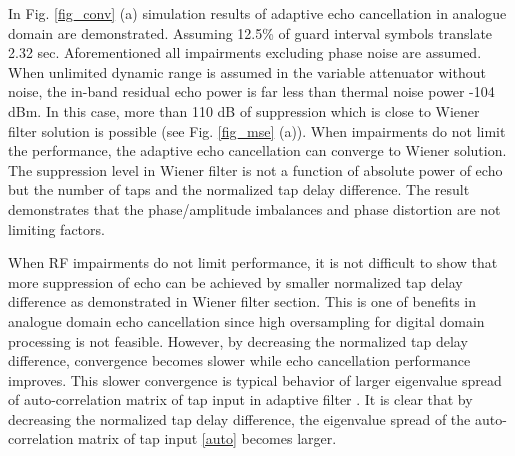 \documentclass[twocolumn]{IEEEtran}
\begin{document}
\begin{figure*}[!ht]

\centerline{ 
    \hfil
{}}


\caption{Adaptive analogue echo canceller with 3 taps,
 and two echoes (-4.2 and -44 dBm): (a)
Convergence (b) Spectrum.} \label{fig_conv}

\end{figure*}

In Fig. \ref{fig_conv} (a) simulation results of adaptive echo
cancellation in analogue domain are demonstrated. Assuming 12.5\% of
guard interval  symbols translate 2.32 sec.
Aforementioned all impairments excluding phase noise are assumed.
When unlimited dynamic range is assumed in the variable attenuator
without noise, the in-band residual echo power is far less than
thermal noise power -104 dBm. In this case, more than 110 dB of
suppression which is close to Wiener filter solution is possible
(see Fig. \ref{fig_mse} (a)). When impairments do not limit the
performance, the adaptive echo cancellation can converge to Wiener
solution. The suppression level in Wiener filter is not a function
of absolute power of echo but the number of taps and the normalized
tap delay difference. The result demonstrates that the
phase/amplitude imbalances and phase distortion are not limiting
factors.

When RF impairments do not limit performance, it is not difficult to
show that more suppression of echo can be achieved by smaller
normalized tap delay difference as demonstrated in Wiener filter
section. This is one of benefits in analogue domain echo
cancellation since high oversampling for digital domain processing
is not feasible. However, by decreasing the normalized tap delay
difference, convergence becomes slower while echo cancellation
performance improves. This slower convergence is typical behavior of
larger eigenvalue spread of auto-correlation matrix of tap input in
adaptive filter \cite{haykin}. It is clear that by decreasing the
normalized tap delay difference, the eigenvalue spread of the
auto-correlation matrix of tap input \eqref{auto} becomes larger.
\end{document}
